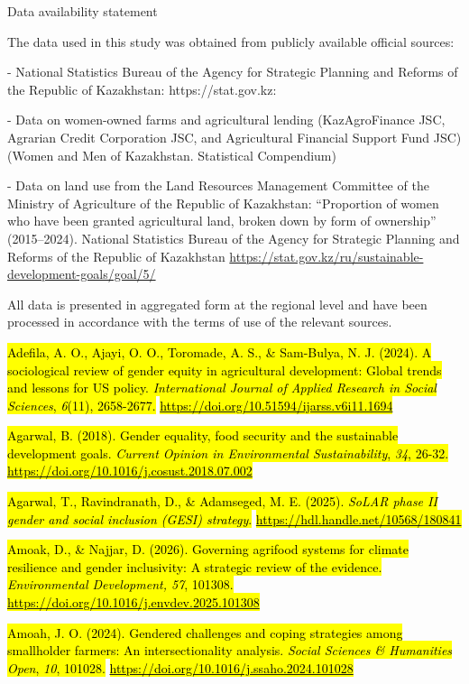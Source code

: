 Data availability statement

The data used in this study was obtained from publicly available
official sources:

- National Statistics Bureau of the Agency for Strategic Planning and
Reforms of the Republic of Kazakhstan: https://stat.gov.kz:

- Data on women-owned farms and agricultural lending (KazAgroFinance
JSC, Agrarian Credit Corporation JSC, and Agricultural Financial Support
Fund JSC) (Women and Men of Kazakhstan. Statistical Compendium)

- Data on land use from the Land Resources Management Committee of the
Ministry of Agriculture of the Republic of Kazakhstan: ``Proportion of
women who have been granted agricultural land, broken down by form of
ownership'' (2015--2024). National Statistics Bureau of the Agency for
Strategic Planning and Reforms of the Republic of Kazakhstan
\url{https://stat.gov.kz/ru/sustainable-development-goals/goal/5/}

All data is presented in aggregated form at the regional level and have
been processed in accordance with the terms of use of the relevant
sources.

\hl{Adefila, A. O., Ajayi, O. O., Toromade, A. S., \& Sam-Bulya, N. J.
(2024). A sociological review of gender equity in agricultural
development: Global trends and lessons for US policy.
\emph{International Journal of Applied Research in Social Sciences},
\emph{6}(11), 2658-2677.}
\href{https://doi.org/10.51594/ijarss.v6i11.1694}{\hl{https://doi.org/10.51594/ijarss.v6i11.1694}}

\hl{Agarwal, B. (2018). Gender equality, food security and the
sustainable development goals. \emph{Current Opinion in Environmental
Sustainability}, \emph{34}, 26-32.}
\href{https://doi.org/10.1016/j.cosust.2018.07.002}{\hl{https://doi.org/10.1016/j.cosust.2018.07.002}}

\hl{Agarwal, T., Ravindranath, D., \& Adamseged, M. E. (2025).
\emph{SoLAR phase II gender and social inclusion (GESI) strategy}.}
\href{https://hdl.handle.net/10568/180841}{\hl{https://hdl.handle.net/10568/180841}}

\hl{Amoak, D., \& Najjar, D. (2026). Governing agrifood systems for
climate resilience and gender inclusivity: A strategic review of the
evidence. \emph{Environmental Development, 57}, 101308.}
\href{https://doi.org/10.1016/j.envdev.2025.101308}{\hl{https://doi.org/10.1016/j.envdev.2025.101308}}

\hl{Amoah, J. O. (2024). Gendered challenges and coping strategies among
smallholder farmers: An intersectionality analysis. \emph{Social
Sciences \& Humanities Open}, \emph{10}, 101028.}
\href{https://doi.org/10.1016/j.ssaho.2024.101028}{\hl{https://doi.org/10.1016/j.ssaho.2024.101028}}


